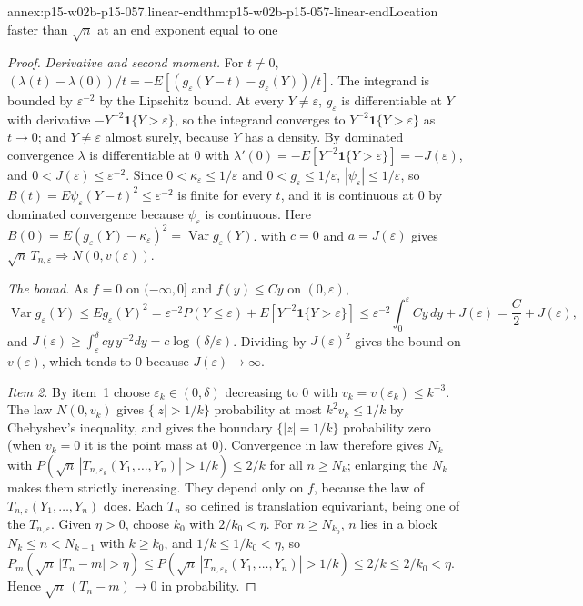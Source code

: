 \begin{annexitem}{annex:p15-w02b-p15-057.linear-end}{thm:p15-w02b-p15-057-linear-end}{Location faster than \(\sqrt n\) at an end exponent equal to one}
\begin{proof}
\emph{Derivative and second moment.} For \(t\neq0\),
\((\lambda(t)-\lambda(0))/t=-E[(g_\varepsilon(Y-t)-g_\varepsilon(Y))/t]\).
The integrand is bounded by \(\varepsilon^{-2}\) by the Lipschitz bound. At
every \(Y\neq\varepsilon\), \(g_\varepsilon\) is differentiable at \(Y\)
with derivative \(-Y^{-2}\mathbf 1\{Y>\varepsilon\}\), so the integrand
converges to \(Y^{-2}\mathbf 1\{Y>\varepsilon\}\) as \(t\to0\); and
\(Y\neq\varepsilon\) almost surely, because \(Y\) has a density. By dominated
convergence \(\lambda\) is differentiable at \(0\) with
\(\lambda'(0)=-E[Y^{-2}\mathbf 1\{Y>\varepsilon\}]=-J(\varepsilon)\), and
\(0<J(\varepsilon)\leq\varepsilon^{-2}\). Since \(0<\kappa_\varepsilon\leq
1/\varepsilon\) and \(0<g_\varepsilon\leq1/\varepsilon\),
\(|\psi_\varepsilon|\leq1/\varepsilon\), so
\(B(t)=E\psi_\varepsilon(Y-t)^2\leq\varepsilon^{-2}\) is finite for every
\(t\), and it is continuous at \(0\) by dominated convergence because
\(\psi_\varepsilon\) is continuous. Here
\(B(0)=E(g_\varepsilon(Y)-\kappa_\varepsilon)^2=\operatorname{Var}g_\varepsilon(Y)\).
 with \(c=0\) and
\(a=J(\varepsilon)\) gives
\(\sqrt n\,T_{n,\varepsilon}\Rightarrow N(0,v(\varepsilon))\).

\emph{The bound.} As \(f=0\) on \((-\infty,0]\) and \(f(y)\leq Cy\) on
\((0,\varepsilon)\),
\[
 \operatorname{Var}g_\varepsilon(Y)\leq Eg_\varepsilon(Y)^2
 =\varepsilon^{-2}P(Y\leq\varepsilon)+E[Y^{-2}\mathbf 1\{Y>\varepsilon\}]
 \leq\varepsilon^{-2}\int_0^\varepsilon Cy\,dy+J(\varepsilon)
 =\frac C2+J(\varepsilon),
\]
and \(J(\varepsilon)\geq\int_\varepsilon^\delta cy\,y^{-2}dy
=c\log(\delta/\varepsilon)\). Dividing by \(J(\varepsilon)^2\) gives the
bound on \(v(\varepsilon)\), which tends to \(0\) because
\(J(\varepsilon)\to\infty\).

\emph{Item 2.} By item~1 choose \(\varepsilon_k\in(0,\delta)\) decreasing
to \(0\) with \(v_k=v(\varepsilon_k)\leq k^{-3}\). The law \(N(0,v_k)\)
gives \(\{|z|>1/k\}\) probability at most \(k^2v_k\leq1/k\) by Chebyshev's
inequality, and gives the boundary \(\{|z|=1/k\}\) probability zero (when
\(v_k=0\) it is the point mass at \(0\)). Convergence in law therefore
gives \(N_k\) with \(P(\sqrt n\,|T_{n,\varepsilon_k}(Y_1,\ldots,Y_n)|>1/k)
\leq2/k\) for all \(n\geq N_k\); enlarging the \(N_k\) makes them strictly
increasing. They depend only on \(f\), because the law of
\(T_{n,\varepsilon}(Y_1,\ldots,Y_n)\) does. Each \(T_n\) so defined is
translation equivariant, being one of the \(T_{n,\varepsilon}\). Given
\(\eta>0\), choose \(k_0\) with \(2/k_0<\eta\). For \(n\geq N_{k_0}\), \(n\)
lies in a block \(N_k\leq n<N_{k+1}\) with \(k\geq k_0\), and
\(1/k\leq1/k_0<\eta\), so
\(P_m(\sqrt n\,|T_n-m|>\eta)\leq
P(\sqrt n\,|T_{n,\varepsilon_k}(Y_1,\ldots,Y_n)|>1/k)\leq2/k\leq2/k_0<\eta\).
Hence \(\sqrt n\,(T_n-m)\to0\) in probability.


\end{proof}
\end{annexitem}
